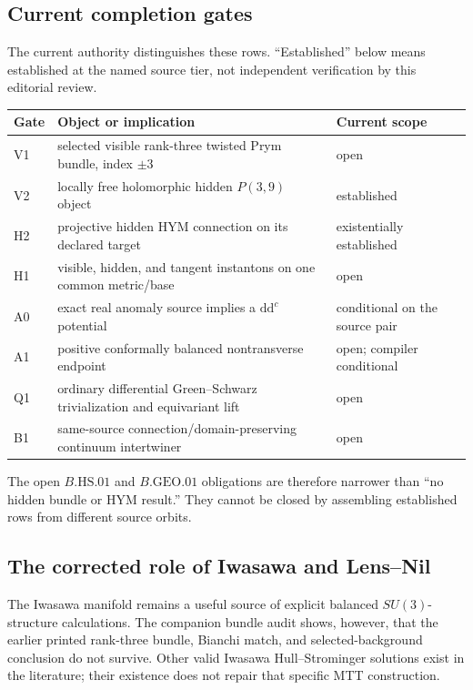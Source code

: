 \documentclass[11pt]{article}
\theoremstyle{definition}
\theoremstyle{remark}
\newcommand{\dd}{\mathrm d}
\begin{document}
\subsection{Current completion gates}
\label{sec:current-gates}

The current authority distinguishes these rows.  ``Established'' below
means established at the named source tier, not independent verification by
this editorial review.
\begin{center}
\small
\begin{tabular}{@{}p{}p{}p{}@{}}
\toprule
Gate & Object or implication & Current scope\\
\midrule
V1 & selected visible rank-three twisted Prym bundle, index \(\pm3\)
   & open\\
V2 & locally free holomorphic hidden \(P(3,9)\) object
   & established\\
H2 & projective hidden HYM connection on its declared target
   & existentially established\\
H1 & visible, hidden, and tangent instantons on one common metric/base
   & open\\
A0 & exact real anomaly source implies a \(\dd\dd^c\) potential
   & conditional on the source pair\\
A1 & positive conformally balanced nontransverse endpoint
   & open; compiler conditional\\
Q1 & ordinary differential Green--Schwarz trivialization and equivariant lift
   & open\\
B1 & same-source connection/domain-preserving continuum intertwiner
   & open\\
\bottomrule
\end{tabular}
\end{center}
The open \(B.\mathrm{HS}.01\) and \(B.\mathrm{GEO}.01\) obligations are
therefore narrower than ``no hidden bundle or HYM result.''  They cannot be
closed by assembling established rows from different source orbits.

\subsection{The corrected role of Iwasawa and Lens--Nil}

The Iwasawa manifold remains a useful source of explicit balanced
\(SU(3)\)-structure calculations.  The companion bundle audit
\cite{NeroFluxAudit2026} shows, however, that the earlier printed rank-three
bundle, Bianchi match, and selected-background conclusion do not survive.
Other valid Iwasawa Hull--Strominger solutions exist in the literature; their
existence does not repair that specific MTT construction.
\end{document}
